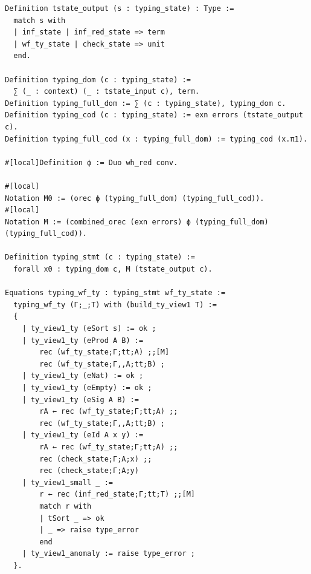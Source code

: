 \documentclass[10pt,a4paper]{amsart}
\begin{document}
\begin{lstlisting}
Definition tstate_output (s : typing_state) : Type :=
  match s with
  | inf_state | inf_red_state => term
  | wf_ty_state | check_state => unit
  end.

Definition typing_dom (c : typing_state) :=
  ∑ (_ : context) (_ : tstate_input c), term.
Definition typing_full_dom := ∑ (c : typing_state), typing_dom c.
Definition typing_cod (c : typing_state) := exn errors (tstate_output c).
Definition typing_full_cod (x : typing_full_dom) := typing_cod (x.π1).

#[local]Definition ϕ := Duo wh_red conv.

#[local]
Notation M0 := (orec ϕ (typing_full_dom) (typing_full_cod)).
#[local]
Notation M := (combined_orec (exn errors) ϕ (typing_full_dom) (typing_full_cod)).

Definition typing_stmt (c : typing_state) :=
  forall x0 : typing_dom c, M (tstate_output c).

Equations typing_wf_ty : typing_stmt wf_ty_state :=
  typing_wf_ty (Γ;_;T) with (build_ty_view1 T) :=
  {
    | ty_view1_ty (eSort s) := ok ;
    | ty_view1_ty (eProd A B) :=
        rec (wf_ty_state;Γ;tt;A) ;;[M]
        rec (wf_ty_state;Γ,,A;tt;B) ;
    | ty_view1_ty (eNat) := ok ;
    | ty_view1_ty (eEmpty) := ok ;
    | ty_view1_ty (eSig A B) :=
        rA ← rec (wf_ty_state;Γ;tt;A) ;;
        rec (wf_ty_state;Γ,,A;tt;B) ;
    | ty_view1_ty (eId A x y) :=
        rA ← rec (wf_ty_state;Γ;tt;A) ;;
        rec (check_state;Γ;A;x) ;;
        rec (check_state;Γ;A;y)
    | ty_view1_small _ :=
        r ← rec (inf_red_state;Γ;tt;T) ;;[M]
        match r with
        | tSort _ => ok
        | _ => raise type_error
        end
    | ty_view1_anomaly := raise type_error ;
  }.


\end{lstlisting}
\end{document}
